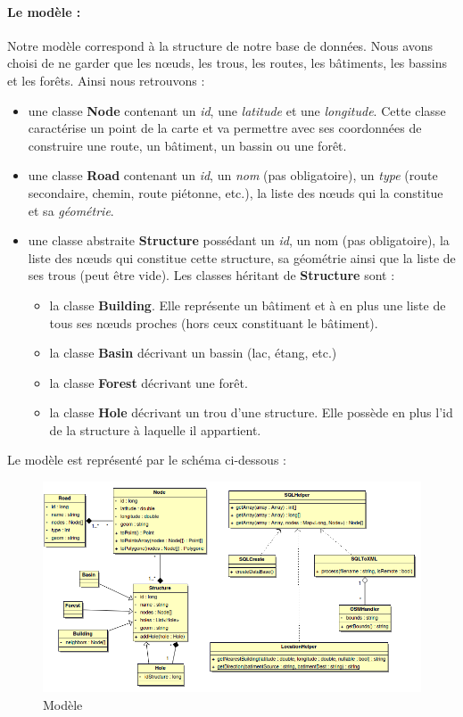 \documentclass[12pt,a4paper,oneside]{article}
\begin{document}
\paragraph{Le modèle : \\}
Notre modèle correspond à la structure de notre base de données. Nous avons choisi de ne garder que les nœuds, les trous, les routes, les bâtiments, les bassins et les forêts. Ainsi nous retrouvons : \\
\renewcommand{\labelitemi}{$\bullet$}
\begin{itemize}
\item une classe \textbf{Node} contenant un \textit{id}, une \textit{latitude} et une \textit{longitude}. Cette classe caractérise un point de la carte et va permettre avec ses coordonnées de construire une route, un bâtiment, un bassin ou une forêt.
\item une classe \textbf{Road} contenant un \textit{id}, un \textit{nom} (pas obligatoire),  un \textit{type} (route secondaire, chemin, route piétonne, etc.), la liste des nœuds qui la constitue et sa \textit{géométrie}.
\item une classe abstraite \textbf{Structure} possédant un \textit{id}, un {nom} (pas obligatoire), la liste des nœuds qui constitue cette structure, sa géométrie ainsi que la liste de ses trous (peut être vide). Les classes héritant de \textbf{Structure} sont :
	\begin{itemize}
	\item la classe \textbf{Building}. Elle représente un bâtiment et à en plus une liste de tous ses nœuds proches (hors ceux constituant le bâtiment).
	\item la classe \textbf{Basin} décrivant un bassin (lac, étang, etc.)
	\item la classe \textbf{Forest} décrivant une forêt.
	\item la classe \textbf{Hole} décrivant un trou d'une structure. Elle possède en plus l'id de la structure à laquelle il appartient.
	\end{itemize}
\end{itemize}
Le modèle est représenté par le schéma ci-dessous :\\

\begin{figure}[H]
\includegraphics[width=1\textwidth]{../images/modeleDonnees.png}
\caption{Modèle}
\end{figure}
\end{document}
